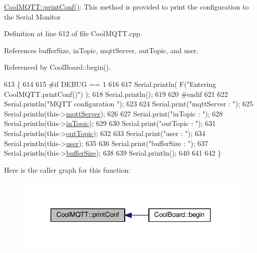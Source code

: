 \hyperlink{classCoolMQTT_a40553a0ad4b5ecf1cb4411ab54ca85fb}{Cool\+M\+Q\+T\+T\+::print\+Conf()}\+: This method is provided to print the configuration to the Serial Monitor 

Definition at line 612 of file Cool\+M\+Q\+T\+T.\+cpp.



References buffer\+Size, in\+Topic, mqtt\+Server, out\+Topic, and user.



Referenced by Cool\+Board\+::begin().


\begin{DoxyCode}
613 \{
614 
615 \textcolor{preprocessor}{#if DEBUG == 1 }
616 
617     Serial.println( F(\textcolor{stringliteral}{"Entering CoolMQTT.printConf()"}) );
618     Serial.println();   
619 
620 \textcolor{preprocessor}{#endif}
621     
622     Serial.println(\textcolor{stringliteral}{"MQTT configuration "});
623 
624     Serial.print(\textcolor{stringliteral}{"mqttServer : "});
625     Serial.println(this->\hyperlink{classCoolMQTT_ab8bb951f87ddbf92db74c2ad16a3e53e}{mqttServer});
626 
627     Serial.print(\textcolor{stringliteral}{"inTopic : "});
628     Serial.println(this->\hyperlink{classCoolMQTT_a4492f52a441e83cc5151010317fdb52d}{inTopic});
629 
630     Serial.print(\textcolor{stringliteral}{"outTopic : "});
631     Serial.println(this->\hyperlink{classCoolMQTT_a109c786a17b463f9eeba046194279522}{outTopic});
632 
633     Serial.print(\textcolor{stringliteral}{"user : "});
634     Serial.println(this->\hyperlink{classCoolMQTT_a8cd47e45d457f908d4b4390b35aaee83}{user});
635 
636     Serial.print(\textcolor{stringliteral}{"bufferSize : "});
637     Serial.println(this->\hyperlink{classCoolMQTT_a7f3cf26b51d6770f216e42c5ef13ca9f}{bufferSize});
638 
639     Serial.println();
640 
641 
642 \}
\end{DoxyCode}
Here is the caller graph for this function\+:
\nopagebreak
\begin{figure}[H]
\begin{center}
\leavevmode
\includegraphics[width=318pt]{classCoolMQTT_a40553a0ad4b5ecf1cb4411ab54ca85fb_icgraph}
\end{center}
\end{figure}
\mbox{\label{classCoolMQTT_ace977b3e90ab14b1199fe5c4fb0a13ec}} 
